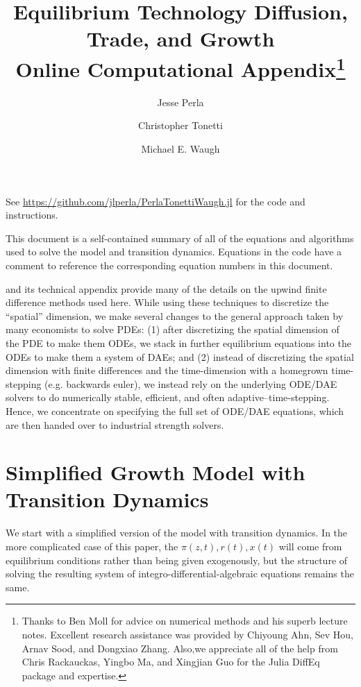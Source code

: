 \documentclass[11pt]{article}
\begin{document}
\title{Equilibrium Technology Diffusion, Trade, and Growth\\Online Computational Appendix\thanks{Thanks to Ben Moll for advice on numerical methods and his superb lecture notes.  Excellent research assistance was provided by Chiyoung Ahn, Sev Hou, Arnav Sood, and Dongxiao Zhang.  Also,we appreciate all of the help from Chris Rackauckas, Yingbo Ma, and Xingjian Guo for the Julia DiffEq package and expertise.}}
\author{Jesse Perla \and Christopher Tonetti \and Michael E. Waugh}
\maketitle

\noindent See \url{https://github.com/jlperla/PerlaTonettiWaugh.jl} for the code and instructions.
\bigskip

This document is a self-contained summary of all of the equations and algorithms used to solve the model and transition dynamics.  Equations in the code have a comment to reference the corresponding equation numbers in this document.

\cite{AchdouHanLasryEtAl2017} and its technical appendix provide many of the details on the upwind finite difference methods used here.  While using these techniques to discretize the ``spatial'' dimension, we make several changes to the general approach taken by many economists to solve PDEs: (1) after discretizing the spatial dimension of the PDE to make them ODEs, we stack in further equilibrium equations into the ODEs to make them a system of DAEs; and (2) instead of discretizing the spatial dimension with finite differences and the time-dimension with a homegrown time-stepping (e.g. backwards euler), we instead rely on the underlying ODE/DAE solvers to do numerically stable, efficient, and often adaptive--time-stepping.  Hence, we concentrate on specifying the full set of ODE/DAE equations, which are then handed over to industrial strength solvers.

\section{Simplified Growth Model with Transition Dynamics}
We start with a simplified version of the model with transition dynamics.  In the more complicated case of this paper, the $\pi(z,t), r(t), x(t)$ will come from equilibrium conditions rather than being given exogenously, but the structure of solving the resulting system of integro-differential-algebraic equations remains the same.
\end{document}
